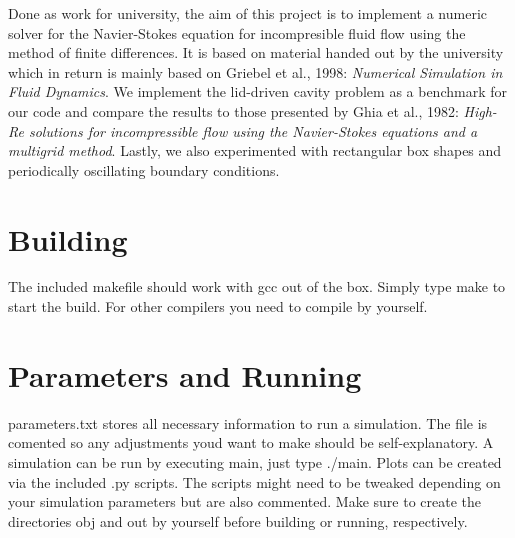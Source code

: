 Done as work for university, the aim of this project is to implement a numeric solver for the Navier-\/\+Stokes equation for incompresible fluid flow using the method of finite differences. It is based on material handed out by the university which in return is mainly based on Griebel et al., 1998\+: {\itshape Numerical Simulation in Fluid Dynamics}. We implement the lid-\/driven cavity problem as a benchmark for our code and compare the results to those presented by Ghia et al., 1982\+: {\itshape High-\/\+Re solutions for incompressible flow using the Navier-\/\+Stokes equations and a multigrid method}. Lastly, we also experimented with rectangular box shapes and periodically oscillating boundary conditions.

 

 

 

\section*{Building}

The included makefile should work with gcc out of the box. Simply type {\ttfamily make} to start the build. For other compilers you need to compile by yourself.

\section*{Parameters and Running}

{\ttfamily parameters.\+txt} stores all necessary information to run a simulation. The file is comented so any adjustments you\textquotesingle{}d want to make should be self-\/explanatory. A simulation can be run by executing {\ttfamily main}, just type {\ttfamily ./main}. Plots can be created via the included {\ttfamily .py} scripts. The scripts might need to be tweaked depending on your simulation parameters but are also commented. Make sure to create the directories {\ttfamily obj} and {\ttfamily out} by yourself before building or running, respectively. 